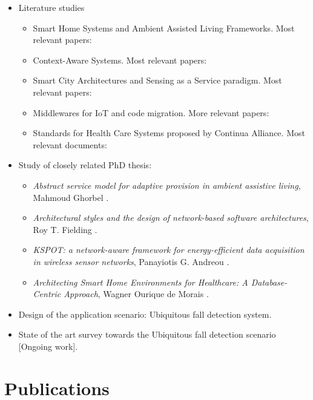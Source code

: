 \documentclass[]{report}
\begin{document}
\begin{itemize}
	\item Literature studies
	\begin{itemize}
		\item Smart Home Systems and Ambient Assisted Living Frameworks. Most relevant papers: \cite{acampora2013survey,blackman2016ambient,memon2014ambient,alam2012review}
		\item Context-Aware Systems. Most relevant papers: \cite{henricksen2005middleware,perera2014context}
		\item Smart City Architectures and Sensing as a Service paradigm. Most relevant papers: \cite{perera2014sensing,perera2014sensor,sheng2013sensing,zaslavsky2013sensing}
		\item Middlewares for IoT and code migration. More relevant papers: \cite{razzaque2016middleware,yu2013application,raychoudhury2013middleware}
		\item Standards for Health Care Systems proposed by Continua Alliance. Most relevant documents: \cite{schreier2014internet,rickardsson2016patient,clarke2007developing}
	\end{itemize}
	\item Study of closely related PhD thesis:
	\begin{itemize}
		\item \textit{Abstract service model for adaptive provision in ambient assistive living},  Mahmoud Ghorbel \cite{ghorbel2008abstract}.
		\item \textit{Architectural styles and the design of network-based software architectures}, Roy T. Fielding \cite{fielding2000architectural}.
		\item \textit{KSPOT: a network-aware framework for energy-efficient data acquisition in wireless sensor networks}, Panayiotis G. Andreou \cite{andreou2011kspot}.
		\item \textit{Architecting Smart Home Environments for Healthcare: A Database-Centric Approach}, Wagner Ourique de Morais \cite{ourique2015architecting}. 
	\end{itemize}
	\item Design of the application scenario: Ubiquitous fall detection system.
	\item State of the art survey towards the Ubiquitous fall detection scenario [Ongoing work].	
\end{itemize}

\section*{Publications}
\end{document}
